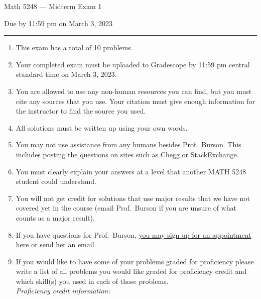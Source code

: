 \documentclass[11pt,addpoints,letterpaper]{exam}
\begin{document}
\vspace*{-0.5in}

\ifprintanswers
\begin{center}
\end{center}
\fi

{\centering

\LARGE Math 5248 --- Midterm Exam 1

}

\smallskip

{\centering

\large Due by 11:59 pm on March 3, 2023

}

\bigskip\bigskip


\hrule

\begin{enumerate}[leftmargin=2em,rightmargin=1em]\setlength{\itemsep}{-2pt}


\item This exam has a total of 10 problems.  


\item Your completed exam must be uploaded to Gradescope by 11:59 pm central standard time on March 3, 2023.  

\item You are allowed to use any non-human resources you can find, but you must cite any sources that you use. Your citation must give enough information for the instructor to find the source you used. 

\item All solutions must be written up using your own words. 

\item You may not use assistance from any humans besides Prof.~Burson. This includes posting the questions on sites such as Chegg or StackExchange.  
\item You must clearly explain your answers at a level that another MATH 5248 student could understand.  

\item You will not get credit for solutions that use major results that we have not covered yet in the course (email Prof.~Burson if you are unsure of what counts as a major result). 

\item If you have questions for Prof.~Burson, \href{https://calendar.google.com/calendar/selfsched?sstoken=UURMcDY3OWhoVDI3fGRlZmF1bHR8ZGMyODk0OWZhNmE4NzQ0ZmUwYmY0ODk2N2I3NDFiYzk}{you may sign up for an appointment here} or send her an email. 

\item If you would like to have some of your problems graded for proficiency please write a list of all problems you would like graded for proficiency credit and which skill(s) you used in each of those problems. \\
\emph{Proficiency credit information:}



\end{enumerate}
\end{document}
